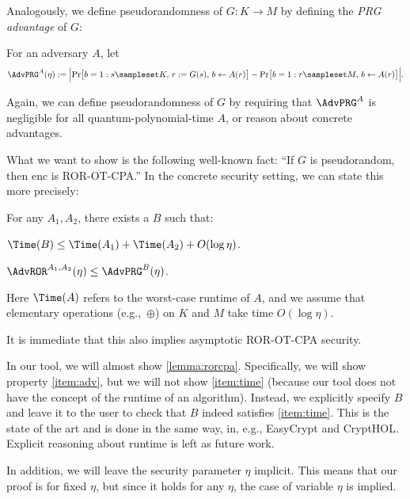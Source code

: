 \documentclass{article}
\begin{document}
Analogously, we define pseudorandomness of $G:K\to M$ by defining the \emph{PRG advantage}%
%
 of $G$:
\begin{definition}\label{def:prg.adv}
  For an adversary $A$, let \symbolindexmark\AdvPRG
  \begin{equation*}
    \AdvPRG^{A}(\eta) :=
    \Bigl\lvert
    \Pr\bigl[b=1:
        s\sampleset K,\, r := G(s),\, b\leftarrow A(r)\bigr]
        -
    \Pr\bigl[b=1:
       r\sampleset M,\, b\leftarrow A(r)\bigr]
       \Bigr\rvert      .
  \end{equation*}
\end{definition}
Again, we can define pseudorandomness of $G$
by requiring that $\AdvPRG^A$
is negligible for all quantum-polynomial-time $A$,
or reason about concrete advantages.

What we want to show is the following well-known fact: ``If $G$
is pseudorandom, then $\mathrm{enc}$
is ROR-OT-CPA.'' In the concrete security setting, we can state this
more precisely:
\begin{lemma}\label{lemma:rorcpa}
  For any $A_1,A_2$, there exists a $B$ such that:
  \begin{compactenum}[(i)]
  \item\label{item:time} $\Time(B) \leq \Time(A_1) + \Time(A_2) + O(\log \eta)$. 
  \item\label{item:adv} $\AdvROR^{A_1,A_2}(\eta) \leq \AdvPRG^B(\eta)$.
  \end{compactenum}
  Here \symbolindexmark\Time$\Time(A)$
  refers to the worst-case runtime of $A$,
  and we assume that elementary operations (e.g.,~$\oplus$)
  on $K$ and $M$ take time $O(\log\eta)$.
\end{lemma}
It is immediate that this also implies asymptotic ROR-OT-CPA security.

In our tool, we will almost show \autoref{lemma:rorcpa}. Specifically,
we will show property \eqref{item:adv}, but we will not show
\eqref{item:time} (because our tool does not have the concept of the
runtime of an algorithm). Instead, we explicitly specify $B$
and leave it to the user to check that $B$
indeed satisfies \eqref{item:time}. This is the state of the art and
is done in the same way, in, e.g., EasyCrypt and CryptHOL. Explicit reasoning about
runtime is left as future work.

In addition, we will leave the security parameter $\eta$
implicit. This means that our proof is for fixed $\eta$,
but since it holds for any $\eta$,
the case of variable $\eta$ is implied.
\end{document}
